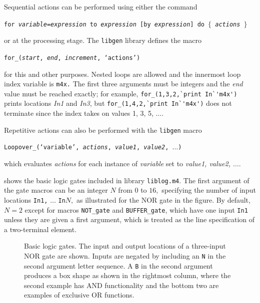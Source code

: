 Sequential actions can be performed using either the
 \dpic command

{\tt for {\sl variable}={\sl expression} to {\sl expression}
 [by {\sl expression}] do $\lbrace$ {\sl actions} $\rbrace$}

\noindent
or at the
\Mfour processing stage.  The {\tt libgen} library defines the macro

{\tt for\_({\sl start}, {\sl end}, {\sl increment}, `{\sl actions}')}

\noindent
for this and other purposes.  Nested loops are allowed and the innermost loop
index variable is {\tt m4x.}
The first three arguments must be
integers and the {\sl end} value must be reached exactly; for example,
\verb|for_(1,3,2,`print In`'m4x')| prints locations {\sl In1} and {\sl In3},
but \verb|for_(1,4,2,`print In`'m4x')| does not terminate since the
index takes on values 1, 3, 5, $\ldots$.

Repetitive actions can also be performed with the {\tt libgen} macro

{\tt Loopover\_(`{\sl variable}', {\sl actions}, {\sl value1},
 {\sl value2}, $\ldots$)}

\noindent
which evaluates {\sl actions} for each instance of {\sl variable} set
to {\sl value1, value2, $\ldots$}.

 shows the basic logic gates included in
library {\tt liblog.m4}.
The first argument of the gate macros can be an integer $N$ from $0$ to $16,$
specifying the number of input
locations {\tt In1,} $\ldots$ {\tt In}$N,$ as illustrated for
the NOR gate in the figure.
By default, $N=2$ except for macros {\tt NOT\_gate} and {\tt BUFFER\_gate},
which have one input {\tt In1} unless they are given a
first argument, which is treated as the line specification of a
two-terminal element.
\begin{figure}[h!]
   \vspace*{-0.5\baselineskip}
   
   \caption{Basic logic gates.  The input and output locations of
      a three-input NOR gate are shown.  Inputs are negated by
      including an {\tt N} in the second argument letter sequence.  A {\tt B}
      in the second argument produces a box shape as shown in the rightmost
      column, where the second example has AND functionality and
      the bottom two are examples of exclusive OR functions.}
   \label{Logic}
   \end{figure}

